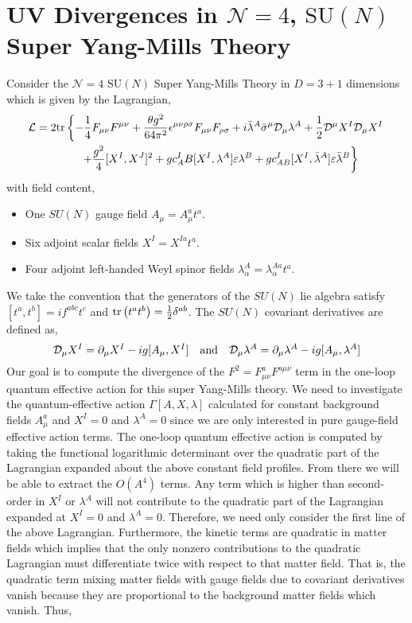 \documentclass[12pt]{article}
\begin{document}

\section{UV Divergences in $\mathcal{N} = 4$, $\mathrm{SU}(N)$ Super Yang-Mills Theory}

Consider the $\mathcal{N} = 4$ $\mathrm{SU}(N)$ Super Yang-Mills Theory in $D = 3 + 1$ dimensions which is given by the Lagrangian,
\begin{align*}
\mathcal{L} & = 2 \mathrm{tr}\left\{
- \frac{1}{4} F_{\mu \nu} F^{\mu \nu}  
+ \frac{\theta g^2}{64 \pi^2} \epsilon^{\mu \nu \rho \sigma} F_{\mu \nu} F_{\rho \sigma} + i \bar{\lambda}^A \bar{\sigma}^\mu \mathcal{D}_\mu \lambda^A + \frac{1}{2} \mathcal{D}^\mu X^I \mathcal{D}_\mu X^I  
\right. \\
& \left. \quad \quad \quad \quad + \frac{g^2}{4} [X^I, X^J]^2 + g c^I_AB [X^I, \lambda^A] \varepsilon \lambda^B + g c^I_{AB} [X^I, \bar{\lambda}^A] \varepsilon \bar{\lambda}^B \right\}
\end{align*}
with field content,
\begin{itemize}
\item One $SU(N)$ gauge field $A_\mu = A^a_\mu t^a$.
\item Six adjoint scalar fields $X^I = X^{Ia} t^a$.
\item Four adjoint left-handed Weyl spinor fields $\lambda^{A}_{\alpha} = \lambda^{Aa}_{\alpha} t^a$.
\end{itemize}
We take the convention that the generators of the $SU(N)$ lie algebra satisfy $[t^a, t^b] = i f^{abc} t^c$ and $\mathrm{tr} \left( t^a t^b \right) = \tfrac{1}{2} \delta^{ab}$. The $SU(N)$ covariant derivatives are defined as,
\[ \mathcal{D}_\mu X^I = \partial_\mu X^I - ig [A_\mu, X^I] \quad \text{and} \quad \mathcal{D}_\mu \lambda^A = \partial_\mu \lambda^A - ig [A_\mu, \lambda^A] \]
Our goal is to compute the divergence of the $F^2 = F_{\mu\nu}^a F^{a \mu \nu}$ term in the one-loop quantum effective action for this super Yang-Mills theory. We need to investigate the quantum-effective action $\Gamma[A, X, \lambda]$ calculated for constant background fields $A_{\mu}^a$ and $X^I = 0$ and $\lambda^A = 0$ since we are only interested in pure gauge-field effective action terms. The one-loop quantum effective action is computed by taking the functional logarithmic determinant over the quadratic part of the Lagrangian expanded about the above constant field profiles. From there we will be able to extract the $O(A^4)$ terms. Any term which is higher than second-order in $X^I$ or $\lambda^A$ will not contribute to the quadratic part of the Lagrangian expanded at $X^I = 0$ and $\lambda^A = 0$. Therefore, we need only consider the first line of the above Lagrangian. Furthermore, the kinetic terms are quadratic in matter fields which implies that the only nonzero contributions to the quadratic Lagrangian must differentiate twice with respect to that matter field. That is, the quadratic term mixing matter fields with gauge fields due to covariant derivatives vanish because they are proportional to the background matter fields which vanish. Thus, 
\end{document}
